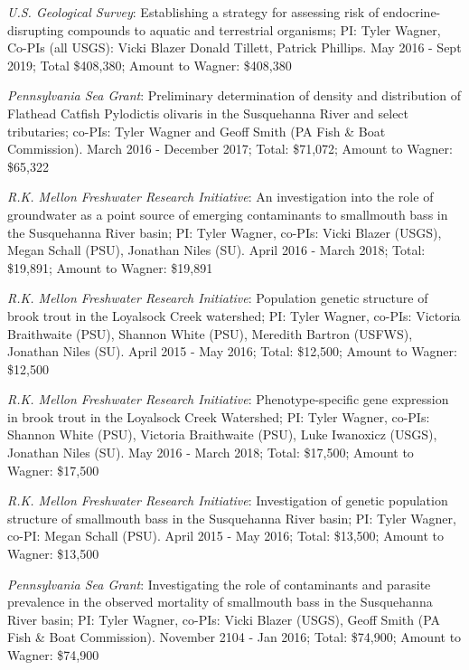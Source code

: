 \documentclass[10pt]{article}
\begin{document}
\begin{flushleft}
\begin{etaremune}
\item {\sl U.S. Geological Survey}: Establishing a strategy for assessing risk of endocrine-disrupting compounds to aquatic and terrestrial organisms; PI: Tyler Wagner, Co-PIs (all USGS): Vicki Blazer Donald Tillett, Patrick Phillips. May 2016 - Sept 2019; Total \$408,380;  Amount to Wagner: \$408,380

\item {\sl Pennsylvania Sea Grant}: Preliminary determination of density and distribution of Flathead Catfish Pylodictis olivaris in the Susquehanna River and select tributaries; co-PIs: Tyler Wagner and Geoff Smith (PA Fish \& Boat Commission). March 2016 - December 2017; Total: \$71,072;  Amount to Wagner: \$65,322

\item {\sl  R.K. Mellon Freshwater Research Initiative}: An investigation into the role of groundwater as a point source of emerging contaminants to smallmouth bass in the Susquehanna River basin; PI: Tyler Wagner, co-PIs: Vicki Blazer (USGS), Megan Schall (PSU), Jonathan Niles (SU). April 2016 - March 2018; Total: \$19,891; Amount to Wagner: \$19,891

\item {\sl  R.K. Mellon Freshwater Research Initiative}: Population genetic structure of brook trout in the Loyalsock Creek watershed; PI: Tyler Wagner, co-PIs: Victoria Braithwaite (PSU), Shannon White (PSU), Meredith Bartron (USFWS), Jonathan Niles (SU). April 2015 - May 2016; Total: \$12,500; Amount to Wagner: \$12,500

\item {\sl  R.K. Mellon Freshwater Research Initiative}: Phenotype-specific gene expression in brook trout in the Loyalsock Creek Watershed; PI: Tyler Wagner, co-PIs: Shannon White (PSU), Victoria Braithwaite (PSU), Luke Iwanoxicz (USGS), Jonathan Niles (SU). May 2016 - March 2018; Total: \$17,500; Amount to Wagner: \$17,500

\item {\sl  R.K. Mellon Freshwater Research Initiative}: Investigation of genetic population structure of smallmouth bass in the Susquehanna River basin; PI: Tyler Wagner, co-PI: Megan Schall (PSU). April 2015 - May 2016; Total: \$13,500; Amount to Wagner: \$13,500

\item {\sl Pennsylvania Sea Grant}: Investigating the role of contaminants and parasite prevalence in the observed mortality of smallmouth bass in the Susquehanna River basin; PI: Tyler Wagner, co-PIs: Vicki Blazer (USGS), Geoff Smith (PA Fish \& Boat Commission). November 2104 - Jan 2016; Total: \$74,900; Amount to Wagner: \$74,900


\end{etaremune}
\end{flushleft}
\end{document}
